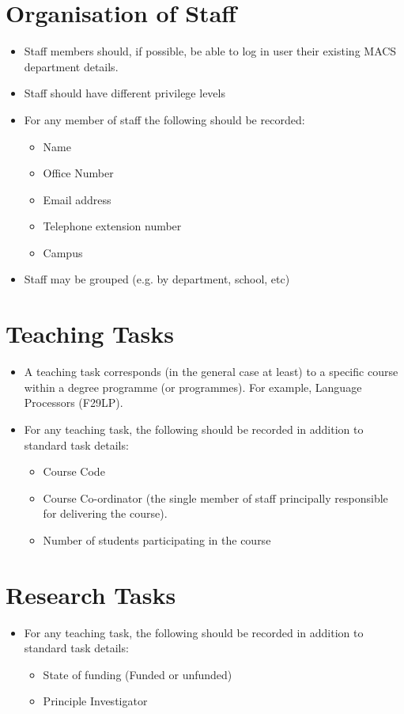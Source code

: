 \documentclass[12pt, a4paper]{article}
\begin{document}
\section{Organisation of Staff}
\begin{itemize}
\item Staff members should, if possible, be able to log in user their existing MACS department details.
\item Staff should have different privilege levels
\item For any member of staff the following should be recorded:
\begin{itemize}
\item Name
\item Office Number
\item Email address
\item Telephone extension number
\item Campus
\end{itemize}
\item Staff may be grouped (e.g. by department, school, etc)
\end{itemize}

\section{Teaching Tasks}
\begin{itemize}
\item A teaching task corresponds (in the general case at least) to a specific course within a degree programme (or programmes). For example, Language Processors (F29LP).
\item For any teaching task, the following should be recorded in addition to standard task details:
\begin{itemize}
\item Course Code
\item Course Co-ordinator (the single member of staff principally responsible for delivering the course).
\item Number of students participating in the course
\end{itemize}
\end{itemize}

\section{Research Tasks}
\begin{itemize}
\item   For any teaching task, the following should be recorded in addition to standard task details:
\begin{itemize}
\item State of funding (Funded or unfunded)
\item Principle Investigator
\end{itemize}
\end{itemize}
\end{document}
